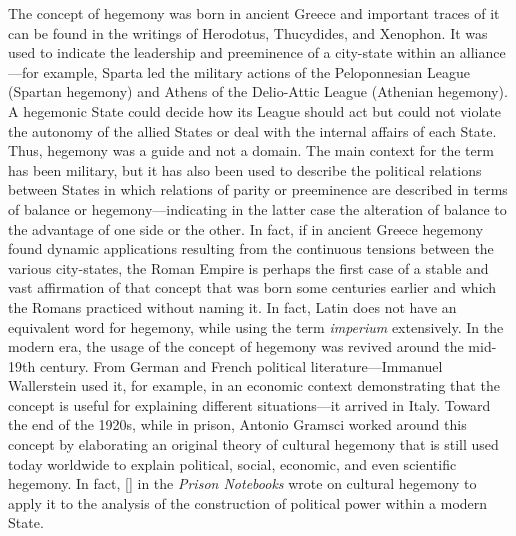 The concept of hegemony was born in ancient Greece and important traces of it can be found in the writings of Herodotus, Thucydides, and Xenophon. It was used to indicate the leadership and preeminence of a city-state within an alliance---for example, Sparta led the military actions of the Peloponnesian League (Spartan hegemony) and Athens of the Delio-Attic League (Athenian hegemony). A hegemonic State could decide how its League should act but could not violate the autonomy of the allied States or deal with the internal affairs of each State. Thus, hegemony was a guide and not a domain. The main context for the term has been military, but it has also been used to describe the political relations between States in which relations of parity or preeminence are described in terms of balance or hegemony---indicating in the latter case the alteration of balance to the advantage of one side or the other. In fact, if in ancient Greece hegemony found dynamic applications resulting from the continuous tensions between the various city-states, the Roman Empire is perhaps the first case of a stable and vast affirmation of that concept that was born some centuries earlier and which the Romans practiced without naming it. In fact, Latin does not have an equivalent word for hegemony, while using the term \textit{imperium} extensively. In the modern era, the usage of the concept of hegemony was revived around the mid-19th century. From \hbox{German} and French political literature---Immanuel Wallerstein used it, for example, in an economic context demonstrating that the concept is useful for explaining different situations---it arrived in Italy. Toward the end of the 1920s, while in prison, Antonio Gramsci worked around this concept by elaborating an original theory of cultural hegemony that is still used today worldwide to explain political, social, economic, and even scientific hegemony. In fact, \citeauthor{chap:8:Gramsci:2011} [\citeyear{chap:8:Gramsci:2011}] in the \textit{Prison Notebooks} wrote on cultural hegemony to apply it to the analysis of the construction of political power within a modern State.

